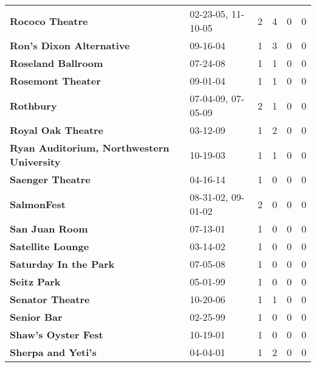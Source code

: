 \begin{supertabular}{p{0.4\textwidth}p{0.3\textwidth}p{0.05\textwidth}p{0.05\textwidth}p{0.05\textwidth}p{0.05\textwidth}}
                                              \textbf{Rococo Theatre} &  02-23-05, 11-10-05 &  2 &  4 &  0 &  0 \\
                                     \textbf{Ron's Dixon Alternative} &            09-16-04 &  1 &  3 &  0 &  0 \\
                                           \textbf{Roseland Ballroom} &            07-24-08 &  1 &  1 &  0 &  0 \\
                                            \textbf{Rosemont Theater} &            09-01-04 &  1 &  1 &  0 &  0 \\
                                                    \textbf{Rothbury} &  07-04-09, 07-05-09 &  2 &  1 &  0 &  0 \\
                                           \textbf{Royal Oak Theatre} &            03-12-09 &  1 &  2 &  0 &  0 \\
                    \textbf{Ryan Auditorium, Northwestern University} &            10-19-03 &  1 &  1 &  0 &  0 \\
                                             \textbf{Saenger Theatre} &            04-16-14 &  1 &  0 &  0 &  0 \\
                                                  \textbf{SalmonFest} &  08-31-02, 09-01-02 &  2 &  0 &  0 &  0 \\
                                               \textbf{San Juan Room} &            07-13-01 &  1 &  0 &  0 &  0 \\
                                            \textbf{Satellite Lounge} &            03-14-02 &  1 &  0 &  0 &  0 \\
                                        \textbf{Saturday In the Park} &            07-05-08 &  1 &  0 &  0 &  0 \\
                                                  \textbf{Seitz Park} &            05-01-99 &  1 &  0 &  0 &  0 \\
                                             \textbf{Senator Theatre} &            10-20-06 &  1 &  1 &  0 &  0 \\
                                                  \textbf{Senior Bar} &            02-25-99 &  1 &  0 &  0 &  0 \\
                                          \textbf{Shaw's Oyster Fest} &            10-19-01 &  1 &  0 &  0 &  0 \\
                                           \textbf{Sherpa and Yeti's} &            04-04-01 &  1 &  2 &  0 &  0 \\

\end{supertabular}
